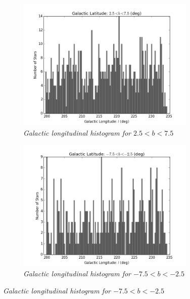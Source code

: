 \documentclass[aps,prb,twocolumn,superscriptaddress]{revtex4-1}
\begin{document}
\begin{figure}
	\centering
	\begin{subfigure}{.5\textwidth}
	  \centering
	  \includegraphics[width=3.35in]{figures/PlotsSpace15/lphist_limit15.png}
		\caption{\it \small{Galactic longitudinal histogram for $2.5 < b < 7.5$}}
		\label{fig:bphist}
	\end{subfigure}%
	\begin{subfigure}{.5\textwidth}
	  \centering
			\includegraphics[width=3.35in]{figures/PlotsSpace15/lnhist_limit15.png}
		\caption{\it \small{Galactic longitudinal histogram for $-7.5 < b < -2.5$ }}
		\label{fig:bnhist}
	\end{subfigure}%
	

\end{figure}
\end{document}
